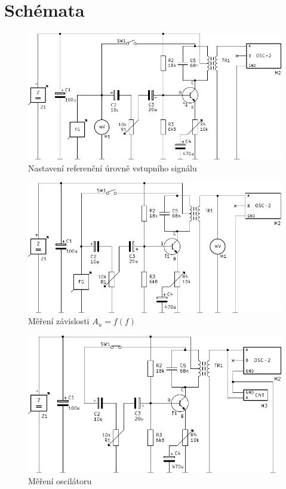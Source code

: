\section*{Schémata}
  \begin{figure}[H]
    \centering
    \includegraphics[width=15.72cm]{../img/sch1.pdf}
    \caption{Nastavení referenční úrovně vstupního signálu}
    \label{sch:1}
  \end{figure}
  
  \begin{figure}[H]
    \centering
    \includegraphics[width=15.264cm]{../img/sch2.pdf}
    \caption{Měření závislosti $A_u = f(f)$}
    \label{sch:2}
  \end{figure}
  
  \begin{figure}[H]
    \centering
    \includegraphics[width=14.508cm]{../img/sch3.pdf}
    \caption{Měření oscilátoru}
    \label{sch:3}
  \end{figure}
  
 


